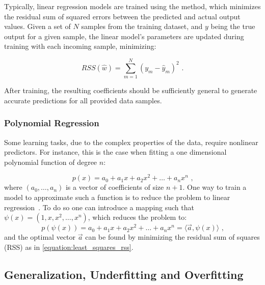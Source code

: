 Typically, linear regression models are trained using the  method, which minimizes the residual sum of squared errors between the predicted and actual output values.
Given a set of \(N\) samples from the training dataset, and \(y\) being the true output for a given sample, the linear model's parameters are updated during training with each incoming sample, minimizing:

\begin{equation}
    RSS(\hat{w}) = \sum_{m=1}^{N} (y_m - \hat{y}_m)^2 \text{ .}
    \label{equation:least_squares_rss}
\end{equation}

After training, the resulting coefficients should be sufficiently general to generate accurate predictions for all provided data samples.

\subsubsection*{Polynomial Regression}

Some learning tasks, due to the complex properties of the data, require nonlinear predictors.
For instance, this is the case when fitting a one dimensional polynomial function of degree \(n\):

\begin{equation}
    p(x) = a_0 + a_1 x + a_2 x^2 + \dots + a_n x^n \text{ ,}
    \label{equation:polynomial_function}
\end{equation}
where \((a_0, \ldots, a_n)\) is a vector of coefficients of size \(n+1\).
One way to train a model to approximate such a function is to reduce the problem to linear regression~\cite{BOOK:ShalevShwartz:Understanding_Machine_Learning}.
To do so one can introduce a mapping such that \(\psi(x)=\left(1, x, x^2, \ldots, x^n\right)\), which reduces the problem to:
\begin{equation}
    p(\psi(x)) = a_0 + a_1 x + a_2 x^2 + \ldots + a_n x^n = \langle \vec{a}, \psi(x) \rangle \text{ ,}
    \label{equation:polynomial_function_linear_mapping}
\end{equation}
and the optimal vector \(\vec{a}\) can be found by minimizing the residual sum of squares (RSS) as in \cref{equation:least_squares_rss}.

\subsection{Generalization, Underfitting and Overfitting}
\label{subsection:generalization_underfitting_overfitting}

